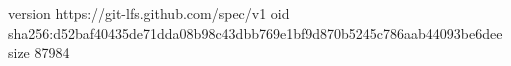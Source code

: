 version https://git-lfs.github.com/spec/v1
oid sha256:d52baf40435de71dda08b98c43dbb769e1bf9d870b5245c786aab44093be6dee
size 87984
